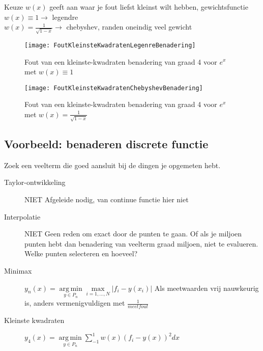 \begin{exam}
\begin{description}
		      Keuze $w(x)$ geeft aan waar je fout liefst kleinst wilt hebben, gewichtsfunctie \\
		      $w(x) \equiv 1 \rightarrow$ legendre \\
		      $w(x) = \frac{1}{\sqrt{1-x}} \rightarrow $ chebyshev, randen oneindig veel gewicht
		      \begin{figure}[h]
			      \centering
			      \texttt{[image: FoutKleinsteKwadratenLegenreBenadering]}
			      \caption{Fout van een kleinste-kwadraten benadering van graad 4 voor $e^x$ met $w(x)\equiv 1$}
		      \end{figure}
		      \begin{figure}[h]
			      \centering
			      \texttt{[image: FoutKleinsteKwadratenChebyshevBenadering]}
			      \caption{Fout van een kleinste-kwadraten benadering van graad 4 voor $e^x$ met $w(x)=\frac{1}{\sqrt{1-x}}$}
		      \end{figure}
	\end{description}

	\subsection{Voorbeeld: benaderen discrete functie}
	Zoek een veelterm die goed aansluit bij de dingen je opgemeten hebt.
	\begin{description}
		\item[Taylor-ontwikkeling] NIET Afgeleide nodig, van continue functie hier niet
		\item[Interpolatie] NIET Geen reden om exact door de punten te gaan. Of als je miljoen punten hebt dan benadering van veelterm graad miljoen, niet te evalueren. Welke punten selecteren en hoeveel?
		\item[Minimax]  $y_n(x) = \underset{y\in P_n}{\operatorname {arg\,min}}\underset{i=1,\ldots,N}{\operatorname {max}}|f_i - y(x_i)|$
		      Als meetwaarden vrij nauwkeurig is, anders vermenigvuldigen met $\frac{1}{meetfout}$
		\item[Kleinste kwadraten]
		      $y_4(x) = \underset{y\in P_n }{\operatorname {arg\,min}} \sum_{-1}^1 w(x) (f_i-y(x))^2 dx $
	\end{description}
\end{exam}

